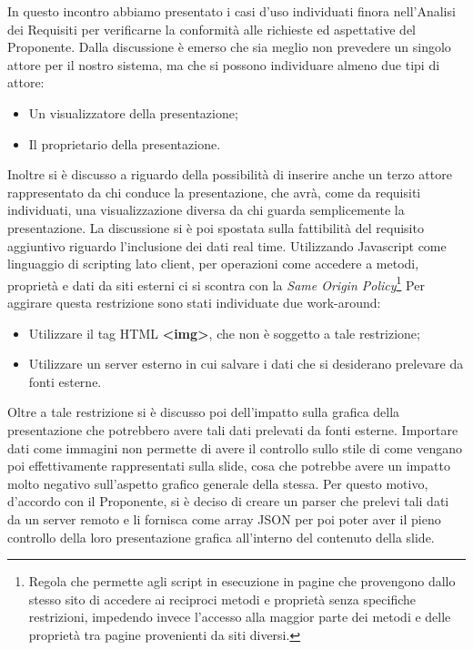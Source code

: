 In questo incontro abbiamo presentato i casi d'uso individuati finora nell'Analisi dei Requisiti per verificarne la conformità alle richieste ed aspettative del Proponente.
\noindent Dalla discussione è emerso che sia meglio non prevedere un singolo attore per il nostro sistema, ma che si possono individuare almeno due tipi di attore:
\begin{itemize}
	\item Un visualizzatore della presentazione;
	\item Il proprietario della presentazione.
\end{itemize}
Inoltre si è discusso a riguardo della possibilità di inserire anche un terzo attore rappresentato da chi conduce la presentazione, che avrà, come da requisiti individuati, una visualizzazione diversa da chi guarda semplicemente la presentazione.
\noindent La discussione si è poi spostata sulla fattibilità del requisito aggiuntivo riguardo l'inclusione dei dati real time. Utilizzando Javascript come linguaggio di scripting lato client, per operazioni come accedere a metodi, proprietà e dati da siti esterni ci si scontra con la \textit{Same Origin Policy}\footnote{Regola che permette agli script in esecuzione in pagine che provengono dallo stesso sito di accedere ai reciproci metodi e proprietà senza specifiche restrizioni, impedendo invece l'accesso alla maggior parte dei metodi e delle proprietà tra pagine provenienti da siti diversi.}
Per aggirare questa restrizione sono stati individuate due work-around:
\begin{itemize}
	\item Utilizzare il tag HTML \textbf{<img>}, che non è soggetto a tale restrizione;
	\item Utilizzare un server esterno in cui salvare i dati che si desiderano prelevare da fonti esterne.
\end{itemize}   
Oltre a tale restrizione si è discusso poi dell'impatto sulla grafica della presentazione che potrebbero avere tali dati prelevati da fonti esterne. Importare dati come immagini non permette di avere il controllo sullo stile di come vengano poi effettivamente rappresentati sulla slide, cosa che potrebbe avere un impatto molto negativo sull'aspetto grafico generale della stessa. Per questo motivo, d'accordo con il Proponente, si è deciso di creare un parser che prelevi tali dati da un server remoto e li fornisca come array JSON per poi poter aver il pieno controllo della loro presentazione grafica all'interno del contenuto della slide.